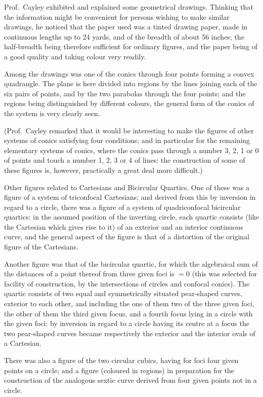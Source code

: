 \documentclass[12pt,a4paper]{article}
\theoremstyle{plain}
\theoremstyle{definition}
\theoremstyle{remark}
\begin{document}
Prof.~Cayley exhibited and explained some geometrical drawings. Thinking that the information might be convenient for persons wishing to make similar drawings, he noticed that the paper used was a tinted drawing paper, made in continuous lengths up to 24 yards, and of the breadth of about 56 inches; the half-breadth being therefore sufficient for ordinary figures, and the paper being of a good quality and taking colour very readily.

Among the drawings was one of the conics through four points forming a convex quadrangle. The plane is here divided into regions by the lines joining each of the six pairs of points, and by the two parabolas through the four points; and the regions being distinguished by different colours, the general form of the conics of the system is very clearly seen.

(Prof.~Cayley remarked that it would be interesting to make the figures of other systems of conics satisfying four conditions; and in particular for the remaining elementary systems of conics, where the conics pass through a number 3, 2, 1 or 0 of points and touch a number 1, 2, 3 or 4 of lines: the construction of some of these figures is, however, practically a great deal more difficult.)

Other figures related to Cartesians and Bicircular Quartics. One of these was a figure of a system of triconfocal Cartesians; and derived from this by inversion in regard to a circle, there was a figure of a system of quadriconfocal bicircular quartics: in the assumed position of the inverting circle, each quartic consists (like the Cartesian which gives rise to it) of an exterior and an interior continuous curve, and the general aspect of the figure is that of a distortion of the original figure of the Cartesians.

Another figure was that of the bicircular quartic, for which the algebraical sum of the distances of a point thereof from three given foci is $= 0$ (this was selected for facility of construction, by the intersections of circles and confocal conics). The quartic consists of two equal and symmetrically situated pear-shaped curves, exterior to each other, and including the one of them two of the three given foci, the other of them the third given focus, and a fourth focus lying in a circle with the given foci: by inversion in regard to a circle having its centre at a focus the two pear-shaped curves became respectively the exterior and the interior ovals of a Cartesian.

There was also a figure of the two circular cubics, having for foci four given points on a circle; and a figure (coloured in regions) in preparation for the construction of the analogous sextic curve derived from four given points not in a circle.
\end{document}
